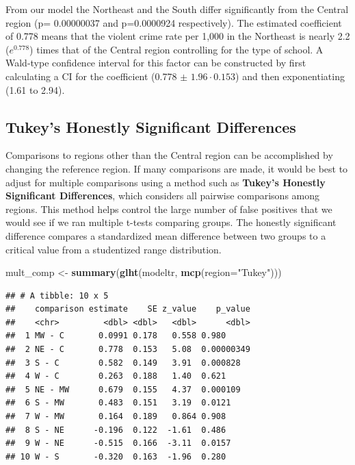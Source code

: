 \documentclass[
]{krantz}
\newenvironment{Shaded}{\begin{snugshade}}{\end{snugshade}}
\newcommand{\DataTypeTok}[1]{\textcolor[rgb]{0.27,0.27,0.27}{#1}}
\newcommand{\KeywordTok}[1]{\textcolor[rgb]{0.27,0.27,0.27}{\textbf{#1}}}
\newcommand{\NormalTok}[1]{#1}
\newcommand{\StringTok}[1]{\textcolor[rgb]{0.5,0.5,0.5}{#1}}
\begin{document}
From our model the Northeast and the South differ significantly from the Central region (p= 0.00000037 and p=0.0000924 respectively). The estimated coefficient of 0.778 means that the violent crime rate per 1,000 in the Northeast is nearly 2.2 (\(e^{0.778}\)) times that of the Central region controlling for the type of school. A Wald-type confidence interval for this factor can be constructed by first calculating a CI for the coefficient (0.778 \(\pm\) \(1.96 \cdot 0.153\)) and then exponentiating (1.61 to 2.94).

\hypertarget{tukeys-honestly-significant-differences}{%
\subsection{Tukey's Honestly Significant Differences}\label{tukeys-honestly-significant-differences}}

Comparisons to regions other than the Central region can be accomplished by changing the reference region. If many comparisons are made, it would be best to adjust for multiple comparisons using a method such as \textbf{Tukey's Honestly Significant Differences},  which considers all pairwise comparisons among regions. This method helps control the large number of false positives that we would see if we ran multiple t-tests comparing groups. The honestly significant difference compares a standardized mean difference between two groups to a critical value from a studentized range distribution.

\begin{Shaded}
\begin{Highlighting}[]
\NormalTok{mult_comp <-}\StringTok{ }\KeywordTok{summary}\NormalTok{(}\KeywordTok{glht}\NormalTok{(modeltr, }\KeywordTok{mcp}\NormalTok{(}\DataTypeTok{region=}\StringTok{"Tukey"}\NormalTok{)))}
\end{Highlighting}
\end{Shaded}

\begin{verbatim}
## # A tibble: 10 x 5
##    comparison estimate    SE z_value    p_value
##    <chr>         <dbl> <dbl>   <dbl>      <dbl>
##  1 MW - C       0.0991 0.178   0.558 0.980     
##  2 NE - C       0.778  0.153   5.08  0.00000349
##  3 S - C        0.582  0.149   3.91  0.000828  
##  4 W - C        0.263  0.188   1.40  0.621     
##  5 NE - MW      0.679  0.155   4.37  0.000109  
##  6 S - MW       0.483  0.151   3.19  0.0121    
##  7 W - MW       0.164  0.189   0.864 0.908     
##  8 S - NE      -0.196  0.122  -1.61  0.486     
##  9 W - NE      -0.515  0.166  -3.11  0.0157    
## 10 W - S       -0.320  0.163  -1.96  0.280
\end{verbatim}
\end{document}
